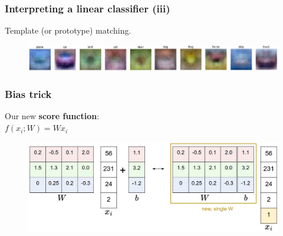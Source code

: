 \begin{frame}
        \frametitle{Interpreting a linear classifier (iii)}

	Template (or prototype) matching.

        \centering
        \begin{figure}
                \includegraphics[width=1\textwidth]{Pics/templates.jpg}
        \end{figure}

\end{frame}

\begin{frame}
	\frametitle{Bias trick}

	Our new \textbf{score function}:\\
	$f(x_i; W) = W x_i$
	
	\begin{figure}
      		\includegraphics[width=1\textwidth]{Pics/wb.jpeg}
        \end{figure}

\end{frame}

